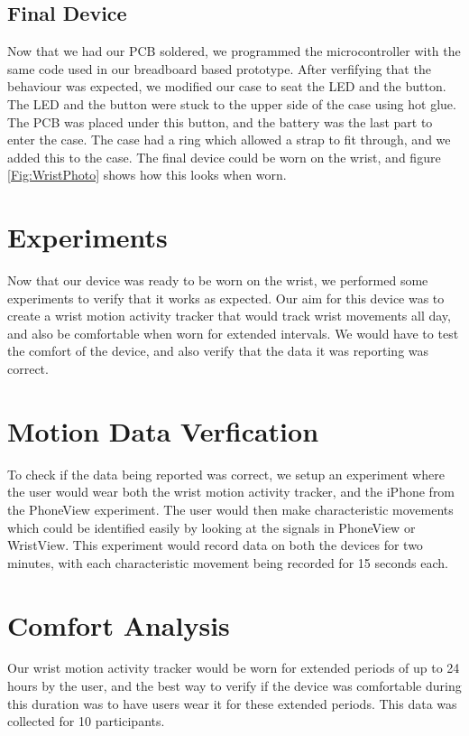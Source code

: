 \subsection{Final Device}
\label{Sec:FinalDevice}
Now that we had our PCB soldered,
we programmed the microcontroller with the same code used in our breadboard based prototype.
After verfifying that the behaviour was expected,
we modified our case to seat the LED and the button.
The LED and the button were stuck to the upper side of the case using hot glue.
The PCB was placed under this button, and the battery was the last part to enter the case.
The case had a ring which allowed a strap to fit through,
and we added this to the case.
The final device could be worn on the wrist,
and figure \ref{Fig:WristPhoto} shows how this looks when worn.

\section{Experiments}
\label{Sec:Experiments}
Now that our device was ready to be worn on the wrist,
we performed some experiments to verify that it works as expected.
Our aim for this device was to create a wrist motion activity tracker that would track wrist movements all day,
and also be comfortable when worn for extended intervals.
We would have to test the comfort of the device,
and also verify that the data it was reporting was correct.

\section{Motion Data Verfication}
\label{Motion Data}
To check if the data being reported was correct,
we setup an experiment where the user would wear both the wrist motion activity tracker,
and the iPhone from the PhoneView experiment.
The user would then make characteristic movements which could be identified easily by looking at the signals in PhoneView or WristView.
This experiment would record data on both the devices for two minutes,
with each characteristic movement being recorded for 15 seconds each.

\section{Comfort Analysis}
\label{Sec:Comfort}
Our wrist motion activity tracker would be worn for extended periods of up to 24 hours by the user,
and the best way to verify if the device was comfortable during this duration was to have users wear it for these extended periods.
This data was collected for 10 participants.